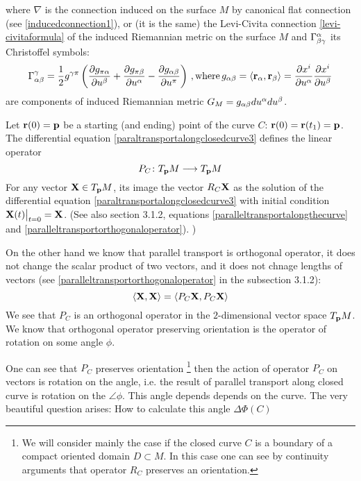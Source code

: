 \documentclass[12pt]{article}
\theoremstyle{theorem}
\numberwithin{equation}{section}
\begin{document}
{{where $\nabla$ is the connection induced on the surface $M$ by canonical flat connection
(see \eqref{inducedconnection1}), or (it is the same)
the Levi-Civita connection \eqref{levi-civitaformula}
of the induced Riemannian metric on the surface $M$
 and $\Gamma^\alpha_{\beta\gamma}$ its Christoffel symbols:
\begin{equation}\label{connectioninduced12}
          \Gamma^\gamma_{\alpha\beta}={1\over 2}g^{\gamma\pi}
      \left({\partial g_{\pi \alpha}\over \partial u^\beta}+{\partial g_{\pi \beta}\over \partial u^\alpha}-
      {\partial g_{\alpha\beta}\over \partial u^\pi}\right)\,,{\rm where}\,
      g_{\alpha\beta}=\langle{\bf r}_\alpha,{\bf r}_\beta\rangle={\partial x^i\over \partial u^\alpha} {\partial x^i\over \partial u^\beta}
     \end{equation}
 are components of induced Riemannian metric
 $G_M=g_{\alpha\beta}du^\alpha du^\beta$.


Let ${\bf r}(0)={\bf p}$ be a starting (and ending) point of the curve $C$: ${\bf r}(0)={\bf r}(t_1)={\bf p}$.
The differential equation \eqref{paraltransportalongclosedcurve3} defines the linear operator
            \begin{equation}\label{linearoperatoroverclosedcurve}
            P_C\colon T_{{\bf p}}M\longrightarrow T_{{\bf p}}M
            \end{equation}
For any vector ${\bf X}\in T_{{\bf p}}M$, its image the vector $R_C{\bf X}$ as the solution of the differential equation
\eqref{paraltransportalongclosedcurve3} with 
initial condition ${\bf X}(t)\big\vert_{t=0}={\bf X}$.
(See also section 3.1.2, equations \eqref{paralleltransportalongthecurve}
and \eqref{paralleltransportorthogonaloperator}).
 )

On the other hand we know that parallel transport is orthogonal
operator, it does not change the scalar product
of two vectors, and it does not chnage lengths of vectors (see
\eqref{paralleltransportorthogonaloperator} in the subsection 3.1.2):
       \begin{equation}\label{linearoperatoroverclosedcurvescalarproduct}
            \langle{\bf X},{\bf X}\rangle=\langle P_C{\bf X},P_C{\bf X}\rangle
            \end{equation}
We see that $P_C$ is an orthogonal operator in the $2$-dimensional vector space $T_{{\bf p}}M$.
We know that orthogonal operator preserving
orientation is the operator of rotation on some angle $\phi$.

One can see that $P_C$ preserves orientation
\footnote{We will consider mainly the case 
if the closed curve $C$ is a boundary of
a compact oriented domain $D\subset M$. 
In this case one can see by continuity arguments
that operator $R_C$ preserves an orientation.}
 then the action of operator $P_C$ on vectors is rotation on the angle,
i.e. the result of parallel transport along closed curve is 
rotation on the $\angle\phi$.
 This angle depends depends on the curve.
The very beautiful question arises:  
How to calculate this angle $\Delta\Phi(C)$


}}
\end{document}
